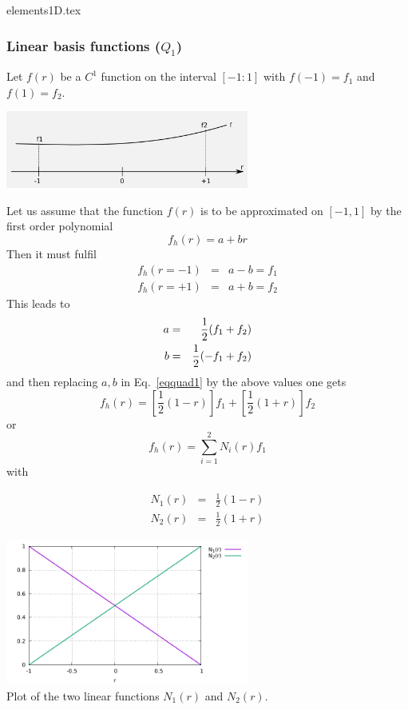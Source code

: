 \begin{flushright} {\tiny {\color{gray} elements1D.tex}} \end{flushright}


\subsubsection{Linear basis functions ($Q_1$) \label{sec:bf1}}

Let $f(r)$ be a $C^1$ function on the interval $[-1:1]$ with $f(-1)=f_1$  and $f(1)=f_2$.
\begin{center}
\includegraphics[width=8cm]{images/linshapefct.png}
\end{center}
Let us assume that the function $f(r)$ is to be approximated on $[-1,1]$ by the first order polynomial 
\begin{equation}
f_h(r)=a+br \label{eqquad1}
\end{equation}
Then it must fulfil
\begin{eqnarray}
f_h(r=-1)&=&a-b =f_1 \nonumber\\
f_h(r=+1)&=&a+b =f_2 \nonumber
\end{eqnarray}
This leads to  
\begin{eqnarray}
a&=&\frac{1}{2}(f_1+f_2)  \nonumber\\
b&=&\frac{1}{2}(-f_1+f_2)  
\end{eqnarray}
and then replacing $a,b$ in Eq.~\eqref{eqquad1} by the above values one gets
\[
f_h(r) = \left[  \frac{1}{2}(1-r)\right] f_1 + \left[ \frac{1}{2}(1+r) \right] f_2
\]
or
\[
f_h(r)=\sum_{i=1}^2 N_i(r) f_1
\]
with
\begin{mdframed}[backgroundcolor=blue!5]
\begin{eqnarray}
N_1(r) &=& \frac{1}{2} (1-r) \nonumber\\
N_2(r) &=& \frac{1}{2} (1+r)
\end{eqnarray}
\end{mdframed}

\begin{center}
\includegraphics[width=8cm]{images/basis1D/linear.pdf}\\
{\captionfont Plot of the two linear functions $N_1(r)$ and $N_2(r)$.}
\end{center}

